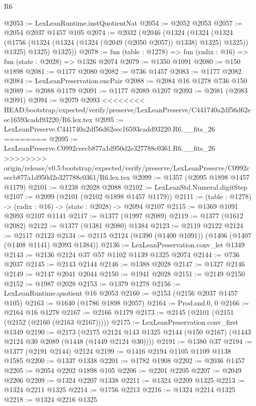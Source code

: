 \begin{lexlean}{R6}
\begin{coremodule}
{{{{{{{{{{{{{{{{{{{{{{{{{{{{{{{{{{{{{{{{{{{{{{{{{{@2053 := LexLeanRuntime.instQuotientNat
@2054 := @2052 @2053
@2057 := @2054 @2037 @1457 @105
@2074 := @2032
    (@2046
      (@1324
        (@1324
          (@1324 (@1756 (@1324 (@1324 (@1324 (@2049 (@2050 @2057)) @1338) @1325) @1325)) @1325)
          @1325)
        @1325))
@2078 := fun (table : @1278) => fun (radix : @16) => fun (state : @2028) => @1326 @2074
@2079 := @1350 @1091
@2080 := @150 @1898
@2081 := @1177 @2080
@2082 := @736 @1457
@2083 := @1177 @2082
@2084 := LexLeanPreservation.encPair
@2088 := @2084 @16 @1278 @736 @150
@2089 := @2088 @1179
@2091 := @1177 @2089 @1207
@2093 := @2081 (@2083 @2091)
@2094 := @2079 @2093
<<<<<<<< HEAD:bootstrap/expected/verify/preserve/LexLeanPreserve/C441740a2df56d62eec16593cadd93220/R6.lex.tex
@2095 := LexLeanPreserve.C441740a2df56d62eec16593cadd93220.R6.__fits_26
========
@2095 := LexLeanPreserve.C0992ceecb877a1d950d2e327788c0361.R6.__fits_26
>>>>>>>> origin/release/v0.5:bootstrap/expected/verify/preserve/LexLeanPreserve/C0992ceecb877a1d950d2e327788c0361/R6.lex.tex
@2099 := @1357 (@2095 @1898 @1457 @1179)
@2101 := @1238 @2028 @2088
@2102 := LexLeanStd.Numeral.digitStep
@2107 := @2099 (@2101 (@2102 @1898 @1457 @1179))
@2111 := (table : @1278) -> (radix : @16) -> (state : @2028) -> @2094 @2107
@2115 := @1369 @1091 @2093 @2107 @1141
@2117 := @1377 (@1997 @2089)
@2119 := @1377 (@1612 @2082)
@2122 := @1377 (@1381 @2080) @1384
@2123 := @2119 @2122
@2124 := @2117 @2123
@2134 := @2115 @2124 (@1390 (@1400 @1091)) (@1406 (@1407 (@1408 @1141) @2093 @1384))
@2136 := LexLeanPreservation.conv_let @1349
@2143 := @2136 @2124 @37 @57 @1102 @1139 @1325 @2074
@2144 := @736 @2037
@2145 := @2143 @2144
@2146 := @1388 @2028
@2147 := @1327 @2146
@2149 := @2147 @2041 @2044
@2150 := @1941 @2028
@2151 := @2149 @2150
@2152 := @1987 @2028
@2153 := @1379 @1278
@2156 := LexLeanRuntime.quotient @16 @2053
@2160 := @2153 (@2156 @2037 @1457 @105)
@2163 := @1640 (@1786 @1898 @2057)
@2164 := Prod.snd.{0, 0}
@2166 := @2164 @16 @1278
@2167 := @2166 @1179
@2173 := @2145 (@2101 (@2151 (@2152 (@2160 (@2163 @2167)))))
@2175 := LexLeanPreservation.conv_first @1349
@2190 := @2173
    (@2175 @2124 @143 @1325 @2144 (@150 @2167) (@1443 @2124 @30 @2089 (@1448 (@1449 @2124 @30))))
@2191 := @1380 @37
@2194 := @1377 (@2191 @2144) @2124
@2199 := @1416 @2194 @1105 @1109 @1138 @1585
@2200 := @1337 @1338
@2201 := @1782 @1908
@2202 := @2036 @1457
@2205 := @2054 @2202 @1898 @105
@2206 := @2201 @2205
@2207 := @2049 @2206
@2209 := @1324 @2207 @1338
@2211 := @1324 @2209 @1325
@2213 := @1324 @2211 @1325
@2214 := @1756 @2213
@2216 := @1324 @2214 @1325
@2218 := @1324 @2216 @1325
}}}}}}}}}}}}}}}}}}}}}}}}}}}}}}}}}}}}}}}}}}}}}}}}}}
\end{coremodule}
\end{lexlean}
